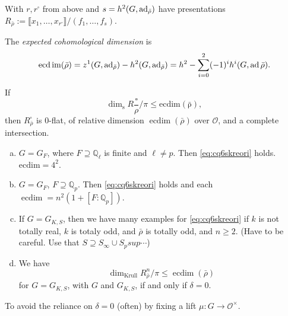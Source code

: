 \documentclass[reqno]{amsart} 
\begin{document}
\begin{corollary}
  With $r, r^{\square}$ from above and $s = h^2(G, \operatorname{ad}_{\bar{\rho}})$ have presentations $R_{\bar{\rho}} := \llbracket x_1, \dotsc, x_{r^{\square}} \rrbracket /(f_1, \dotsc, f_s)$.
\end{corollary}
\begin{definition}[ad hoc]
  The \emph{expected cohomological dimension} is
  \begin{equation*}
    \operatorname{e c d} \operatorname{i m}(\bar{\rho}) = z^1(G, \operatorname{ad}_{\bar{\rho}}) - h^2(G, \operatorname{ad}_{\bar{\rho}}) = h^2 - \sum_{i = 0}^2(-1)^{i} h^i(G, \operatorname{ad} \bar{\rho}). 
  \end{equation*}
\end{definition}
\begin{proposition}
  If
  \begin{equation}\label{eq:cq6skreori}
    \dim_{\mathrm{\operatorname{s}}} R \frac{\square}{\rho} / \pi \leq \mathrm{ec dim(\bar{\rho})},
  \end{equation}
  then $R_{\bar{\rho}}^{\square}$ is $0$-flat, of relative dimension $\operatorname{e c dim}(\bar{\rho})$ over $\mathcal{O}$, and a complete intersection.
\end{proposition}
\begin{example}
  \begin{enumerate}[(a)]
  \item $G = G_F$, where $F \supseteq \mathbb{Q}_{\ell}$ is finite and $\ell \neq p$.  Then \eqref{eq:cq6skreori} holds.  $\mathrm{e c dim} = 4^2$.
  \item $G = G_F$, $F \supseteq \mathbb{Q}_p$.  Then \eqref{eq:cq6skreori} holds and each $\operatorname{ec dim} = n^2(1 +[F : \mathbb{Q}_p])$.
  \item If $G = G_{K, S}$, then we have many examples for \eqref{eq:cq6skreori} if $k$ is not totally real, $k$ is totaly odd, and $\bar{\rho}$ is totally odd, and $n \geq 2$.  (Have to be careful.  Use that $S \supseteq S_\infty \cup S_p sup \dotsb$)
  \item We have
    \begin{equation*}
      \dim_{\mathrm{Krull}} R_{\bar{\rho}}^n / \pi \leq \operatorname{ecdim}(\bar{\rho})
    \end{equation*}
    for $G = G_{K, S}$, with $G$ and $G_{K, S}$, if and only if $\delta = 0$.
  \end{enumerate}
\end{example}
\begin{remark}
  To avoid the reliance on $\delta = 0$ (often) by fixing a lift $\mu : G \rightarrow \mathcal{O}^\times$.
\end{remark}
\end{document}
